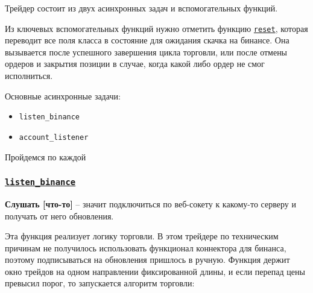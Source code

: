 Трейдер состоит из двух асинхронных задач и вспомогательных функций. 

Из ключевых вспомогательных функций нужно отметить функцию \href{https://github.com/dexety/dex-trading-system/blob/main/research/ib-0002-cross-analysis/trader.py#L303}{\texttt{reset}}, которая переводит все поля класса в состояние для ожидания скачка на бинансе. Она вызывается после успешного завершения цикла торговли, или после отмены ордеров и закрытия позиции в случае, когда какой либо ордер не смог исполниться.

Основные асинхронные задачи:
\begin{itemize}
    \item \texttt{listen\_binance}
    \item \texttt{account\_listener}
\end{itemize}

Пройдемся по каждой

\subsubsection{\href{https://github.com/dexety/dex-trading-system/blob/main/research/ib-0002-cross-analysis/trader.py#L167}{\texttt{listen\_binance}}}
\begin{definition}
\textbf{Слушать [что-то]} -- значит подключиться по веб-сокету к какому-то серверу и получать от него обновления.
\end{definition} 

Эта функция реализует логику торговли. В этом трейдере по техническим причинам не получилось использовать функционал коннектора для бинанса, поэтому подписываться на обновления пришлось в ручную. Функция держит окно трейдов на одном направлении фиксированной длины, и если перепад цены превысил порог, то запускается алгоритм торговли:

